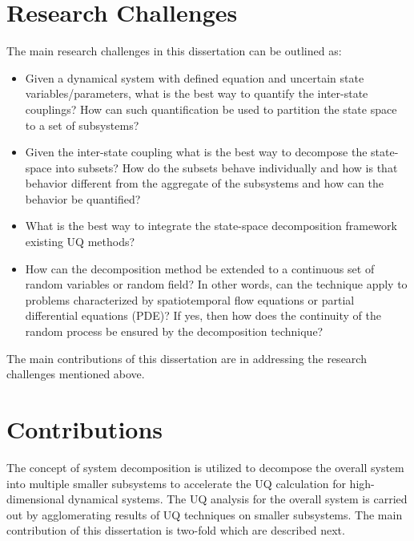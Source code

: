 \section{Research Challenges}

The main research challenges in this dissertation can be outlined as:
\begin{itemize}
\item Given a dynamical system with defined equation and uncertain state variables/parameters, what is the best way to quantify the inter-state couplings? How can such quantification be used to partition the state space to a set of subsystems? 
\item Given the inter-state coupling what is the best way to decompose the state-space into subsets? How do the subsets behave individually and how is that behavior different from the aggregate of the subsystems and how can the behavior be quantified? 
\item What is the best way to integrate the state-space decomposition framework existing UQ methods?
\item How can the decomposition method be extended to a continuous set of random variables or random field? In other words, can the technique apply to problems characterized by spatiotemporal flow equations or partial differential equations (PDE)? If yes, then how does the continuity of the random process be ensured by the decomposition technique?
\end{itemize}

The main contributions of this dissertation are in addressing the research challenges mentioned above.


\section{Contributions}

The concept of system decomposition is utilized to decompose the overall system into multiple smaller subsystems to accelerate the UQ calculation for high-dimensional dynamical systems. The UQ analysis for the overall system is carried out by agglomerating results of UQ techniques on smaller subsystems. The main contribution of this dissertation is two-fold which are described next.

